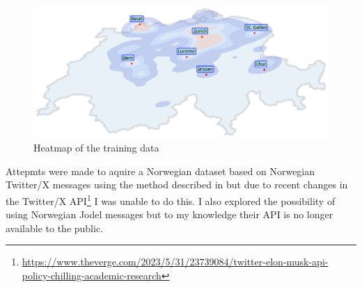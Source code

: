 \begin{figure}
    \centering
    \includegraphics[width=\textwidth]{./figs/heatmap.png}
    \caption{Heatmap of the training data}
    \label{fig:heatmap}
\end{figure}

Attepmts were made to aquire a Norwegian dataset based on Norwegian Twitter/X messages using the method described in \cite{ljubesicTweetGeoToolCollecting2016} but due to recent changes in the Twitter/X API\footnote{\url{https://www.theverge.com/2023/5/31/23739084/twitter-elon-musk-api-policy-chilling-academic-research}} I was unable to do this. I also explored the possibility of using Norwegian Jodel messages but to my knowledge their API is no longer available to the public.